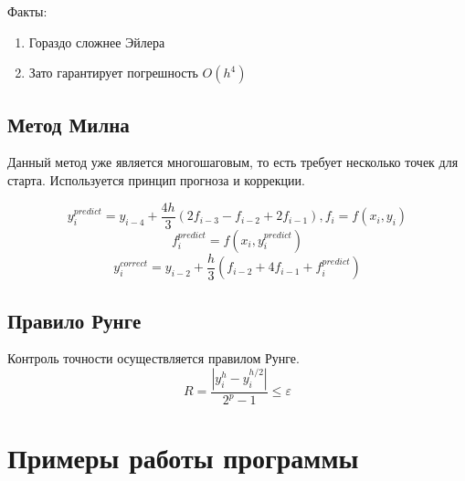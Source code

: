 \documentclass{article}
\begin{document}
Факты:
\begin{enumerate}
    \item Гораздо сложнее Эйлера
    \item Зато гарантирует погрешность $O(h^4)$
\end{enumerate}




\subsection{Метод Милна}

Данный метод уже является многошаговым, то есть 
требует несколько точек для старта. Используется 
принцип прогноза и коррекции.

\begin{equation}
    y^{predict}_i = y_{i-4} + \frac{4h}{3}(2f_{i-3} - f_{i-2} + 2f_{i-1}), f_{i} = f(x_i, y_i)
\end{equation}
\begin{equation}
    f^{predict}_i = f(x_i, y^{predict}_i)
\end{equation}
\begin{equation}
    y^{correct}_i = y_{i-2} + \frac{h}{3}(f_{i-2} + 4f_{i-1} + f^{predict}_i)
\end{equation}



\subsection{Правило Рунге}

Контроль точности осуществляется правилом Рунге.
\begin{equation}
    R = \frac{|y_i^h - y_i^{h/2}|}{2^p - 1} \leq \varepsilon
\end{equation}

\section{Примеры работы программы}
\end{document}
